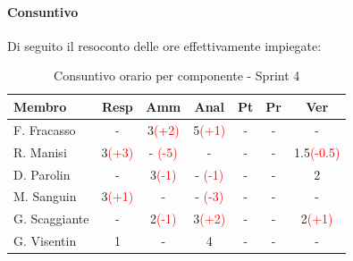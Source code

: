 \documentclass[a4paper,12pt]{article}
\begin{document}
\paragraph{Consuntivo}
Di seguito il resoconto delle ore effettivamente impiegate:

\begin{table}[H]
    \centering
    \renewcommand{\arraystretch}{1.3}
    \small
    \begin{tabularx}{\textwidth}{|l|C|C|C|C|C|C|}
        \hline
        \textbf{Membro} & \textbf{Resp} & \textbf{Amm} & \textbf{Anal} & \textbf{Pt} & \textbf{Pr} & \textbf{Ver} \\
        \hline
        F. Fracasso & - & 3\textcolor{red}{(+2)} & 5\textcolor{red}{(+1)} & - & - & - \\
        \hline
        R. Manisi & 3\textcolor{red}{(+3)} & - \textcolor{red}{(-5)} & - & - & - & 1.5\textcolor{red}{(-0.5)} \\
        \hline
        D. Parolin & - & 3\textcolor{red}{(-1)} & - \textcolor{red}{(-1)} & - & - & 2 \\
        \hline
        M. Sanguin & 3\textcolor{red}{(+1)} & - & - \textcolor{red}{(-3)} & - & - & - \\
        \hline
        G. Scaggiante & - & 2\textcolor{red}{(-1)} & 3\textcolor{red}{(+2)} & - & - & 2\textcolor{red}{(+1)} \\
        \hline
        G. Visentin & 1 & - & 4 & - & - & - \\
        \hline
    \end{tabularx}
    \caption{Consuntivo orario per componente - Sprint 4}
    \label{tab:consuntivo_sprint4}
\end{table}
\end{document}
